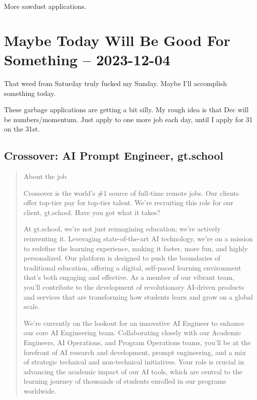 \documentclass[
	letterpaper, %
	12pt, %
]{CSSullivanBusinessReport}
\begin{document}
More sawdust applications. 


\section[4 Dec: LinkedIn]{Maybe Today Will Be Good For Something -- 2023-12-04} %

That weed from Saturday truly fucked my Sunday. Maybe I'll accomplish something today. 

These garbage applications are getting a bit silly. My rough idea is that Dec will be numbers/momentum. Just apply to one more job each day, until I apply for 31 on the 31st. 

\subsection[Crossover]{Crossover: AI Prompt Engineer, gt.school}

\begin{quote}
	About the job
	
	Crossover is the world's \#1 source of full-time remote jobs. Our clients offer top-tier pay for top-tier talent. We're recruiting this role for our client, gt.school. Have you got what it takes?

	At gt.school, we're not just reimagining education; we're actively reinventing it. Leveraging state-of-the-art AI technology, we're on a mission to redefine the learning experience, making it faster, more fun, and highly personalized. Our platform is designed to push the boundaries of traditional education, offering a digital, self-paced learning environment that's both engaging and effective. As a member of our vibrant team, you'll contribute to the development of revolutionary AI-driven products and services that are transforming how students learn and grow on a global scale.

	We're currently on the lookout for an innovative AI Engineer to enhance our core AI Engineering team. Collaborating closely with our Academic Engineers, AI Operations, and Program Operations teams, you'll be at the forefront of AI research and development, prompt engineering, and a mix of strategic technical and non-technical initiatives. Your role is crucial in advancing the academic impact of our AI tools, which are central to the learning journey of thousands of students enrolled in our programs worldwide.

\end{quote}
\end{document}

